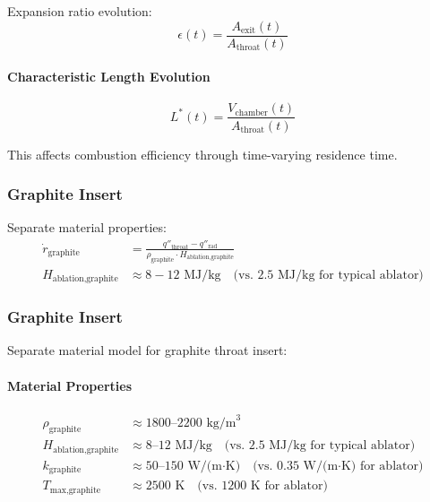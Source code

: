 \documentclass[12pt,a4paper]{article}
\newcommand{\Lstar}{L^{*}}
\newcommand{\eps}{\epsilon}
\begin{document}
Expansion ratio evolution:
\begin{equation}
\eps(t) = \frac{A_{\text{exit}}(t)}{A_{\text{throat}}(t)}
\end{equation}

\paragraph{Characteristic Length Evolution}

\begin{equation}
\Lstar(t) = \frac{V_{\text{chamber}}(t)}{A_{\text{throat}}(t)}
\end{equation}

This affects combustion efficiency through time-varying residence time.

\subsubsection{Graphite Insert}

Separate material properties:
\begin{align}
\dot{r}_{\text{graphite}} &= \frac{q''_{\text{throat}} - q''_{\text{rad}}}{\rho_{\text{graphite}} \cdot H_{\text{ablation,graphite}}} \\
H_{\text{ablation,graphite}} &\approx 8-12 \text{ MJ/kg} \quad \text{(vs. 2.5 MJ/kg for typical ablator)}
\end{align}

\subsubsection{Graphite Insert}

Separate material model for graphite throat insert:

\paragraph{Material Properties}

\begin{align}
\rho_{\text{graphite}} &\approx 1800\text{--}2200 \text{ kg/m}^3 \\
H_{\text{ablation,graphite}} &\approx 8\text{--}12 \text{ MJ/kg} \quad \text{(vs. 2.5 MJ/kg for typical ablator)} \\
k_{\text{graphite}} &\approx 50\text{--}150 \text{ W/(m·K)} \quad \text{(vs. 0.35 W/(m·K) for ablator)} \\
T_{\text{max,graphite}} &\approx 2500 \text{ K} \quad \text{(vs. 1200 K for ablator)}
\end{align}
\end{document}
